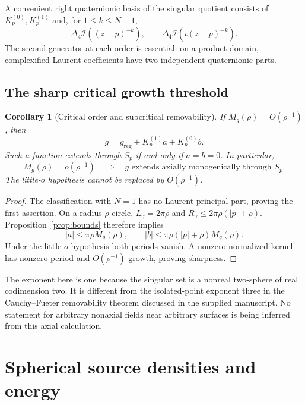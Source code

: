 \documentclass[11pt,a4paper]{article}
\numberwithin{equation}{section}
\newtheorem{corollary}[theorem]{Corollary}
\theoremstyle{definition}
\theoremstyle{remark}
\newcommand{\cI}{\mathcal I}
\newcommand{\lap}{\Delta_4}
\newcommand{\Kzero}{K_p^{(0)}}
\newcommand{\Kone}{K_p^{(1)}}
\begin{document}
A convenient right quaternionic basis of the singular quotient consists of
$K_p^{(0)},K_p^{(1)}$ and, for $1\leq k\leq N-1$,
\begin{equation}\label{eq:sing-basis}
 \lap\cI((z-p)^{-k}),\qquad
 \lap\cI(\iota(z-p)^{-k}).
\end{equation}
The second generator at each order is essential: on a product domain,
complexified Laurent coefficients have two independent quaternionic parts.

\subsection{The sharp critical growth threshold}
\begin{corollary}[Critical order and subcritical removability]
\label{cor:critical}
If $M_g(\rho)=O(\rho^{-1})$, then
\begin{equation}\label{eq:critical-normal}
 g=g_{\mathrm{reg}}+\Kone a+\Kzero b.
\end{equation}
Such a function extends through $S_p$ if and only if $a=b=0$. In particular,
\begin{equation}\label{eq:small-o}
 M_g(\rho)=o(\rho^{-1})\quad\Longrightarrow\quad
 g\text{ extends axially monogenically through }S_p.
\end{equation}
The little-$o$ hypothesis cannot be replaced by $O(\rho^{-1})$.
\end{corollary}
\begin{proof}
The classification with $N=1$ has no Laurent principal part, proving the first
assertion. On a radius-$\rho$ circle,
$L_\gamma=2\pi\rho$ and
$R_\gamma\leq2\pi\rho(|p|+\rho)$. Proposition~\ref{prop:bounds} therefore
implies
\[
 |a|\leq\pi\rho M_g(\rho),\qquad
 |b|\leq\pi\rho(|p|+\rho)M_g(\rho).
\]
Under the little-$o$ hypothesis both periods vanish. A nonzero normalized
kernel has nonzero period and $O(\rho^{-1})$ growth, proving sharpness.
\end{proof}

The exponent here is one because the singular set is a nonreal two-sphere of
real codimension two. It is different from the isolated-point exponent three
in the Cauchy--Fueter removability theorem discussed in the supplied manuscript.
No statement for arbitrary nonaxial fields near arbitrary surfaces is being
inferred from this axial calculation.

\section{Spherical source densities and energy}
\label{sec:sources}
\end{document}
